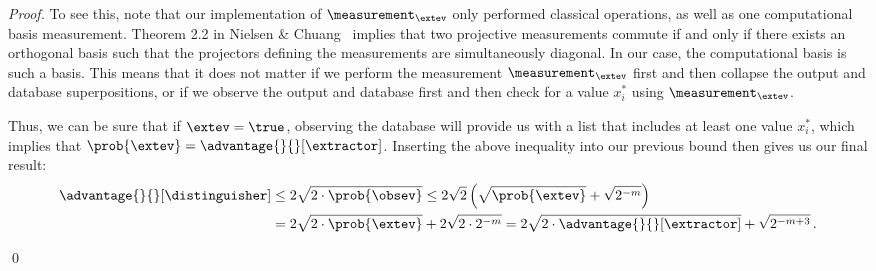 \begin{proof}
      To see this, note that our implementation of
        $\measurement_\extev$ only performed classical operations, as well as 
        one computational basis measurement. Theorem 2.2 in Nielsen \&
        Chuang~\cite[p.77]{NieChu10} implies that two projective measurements
        commute if and only if there exists
        an orthogonal basis such that the projectors defining the measurements are
        simultaneously diagonal. In our case, the computational basis is such a
        basis. This means that it does not matter if we perform the
        measurement $\measurement_\extev$ first and then collapse the output
        and database superpositions, or if we observe the output and database
        first and then check for a value $x^*_i$ using $\measurement_\extev$.

      Thus, we can be sure that if $\extev = \true$,
        observing the database will provide us with a list that includes at least
        one value $x^*_i$, which implies that $\prob{\extev} = \advantage{}{}[\extractor]$.
        Inserting the above inequality into our previous bound then gives us our
        final result:
        \begin{align*}
          \advantage{}{}[\distinguisher] &\leq 2 \sqrt{ 2 \cdot \prob{\obsev} } 
          \leq 2 \sqrt{2} \left( \sqrt{\prob{\extev}} + \sqrt{2^{-m}} \right) \\
          &= 2 \sqrt{2 \cdot \prob{\extev}} + 2\sqrt{2 \cdot 2^{-m}} 
          = 2 \sqrt{2 \cdot \advantage{}{}[\extractor]} + \sqrt{2^{-m+3}}\, .
        \end{align*}

      \qed 
      

    \end{proof}


